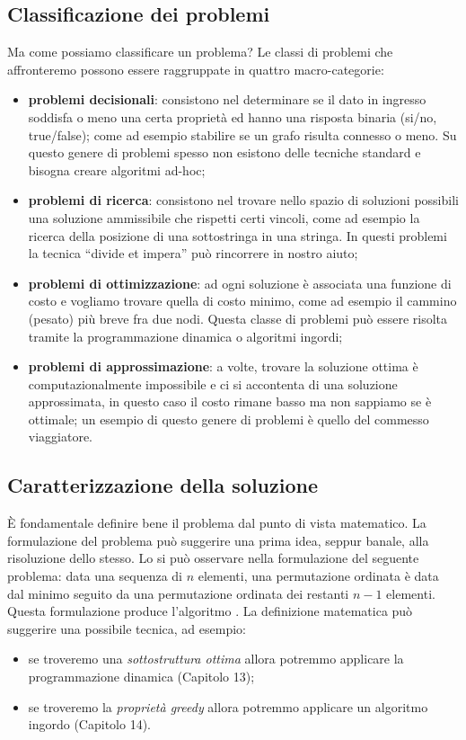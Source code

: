 \subsection*{Classificazione dei problemi}

Ma come possiamo classificare un problema?
Le classi di problemi che affronteremo possono essere raggruppate in quattro macro-categorie:
\begin{itemize}
	\item \textbf{problemi decisionali}: consistono nel determinare se il dato in ingresso soddisfa o meno una certa proprietà ed hanno una risposta binaria (si/no, true/false); come ad esempio stabilire se un grafo risulta connesso o meno.
	Su questo genere di problemi spesso non esistono delle tecniche standard e bisogna creare algoritmi ad-hoc;
	\item \textbf{problemi di ricerca}: consistono nel trovare nello spazio di soluzioni possibili una soluzione ammissibile che rispetti certi vincoli, come ad esempio la ricerca della posizione di una sottostringa in una stringa.
	In questi problemi la tecnica \enquote{divide et impera} può rincorrere in nostro aiuto;
	\item \textbf{problemi di ottimizzazione}: ad ogni soluzione è associata una funzione di costo e vogliamo trovare quella di costo minimo, come ad esempio il cammino (pesato) più breve fra due nodi.
	Questa classe di problemi può essere risolta tramite la programmazione dinamica o algoritmi ingordi;
	\item \textbf{problemi di approssimazione}: a volte, trovare la soluzione ottima è computazionalmente impossibile e ci si accontenta di una soluzione approssimata, in questo caso il costo rimane basso ma non sappiamo se è ottimale; un esempio di questo genere di problemi è quello del commesso viaggiatore.
\end{itemize}

\subsection*{Caratterizzazione della soluzione}

\`{E} fondamentale definire bene il problema dal punto di vista matematico.
La formulazione del problema può suggerire una prima idea, seppur banale, alla risoluzione dello stesso.
Lo si può osservare nella formulazione del seguente problema: data una sequenza di \(n\) elementi, una permutazione ordinata è data dal minimo seguito da una permutazione ordinata dei restanti \(n-1\) elementi.
Questa formulazione produce l'algoritmo \selectionSort.
La definizione matematica può suggerire una possibile tecnica, ad esempio:
\begin{itemize}
	\item se troveremo una \emph{sottostruttura ottima} allora potremmo applicare la programmazione dinamica (Capitolo 13);
	\item se troveremo la \emph{proprietà greedy} allora potremmo applicare un algoritmo ingordo (Capitolo 14).
\end{itemize}

